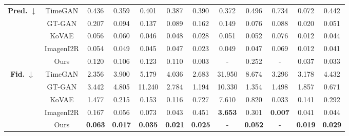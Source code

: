 \documentclass{article}
\theoremstyle{plain}
\theoremstyle{definition}
\theoremstyle{remark}
\begin{document}
\begin{table}[!t]
{\begin{tabular}{cc|cccccccccc}
    \multirow{5}{*}{\textbf{Pred.} $\downarrow$}
      & TimeGAN
         & 0.436
         & 0.359
         & 0.401
         & 0.387
         & 0.390
         & 0.372
         & 0.496
         & 0.734
         & 0.072
         & 0.442 \\
      & GT-GAN
         & 0.207
         & 0.094
         & 0.137
         & 0.089
         & 0.162
         & 0.149
         & 0.076
         & 0.088
         & 0.020
         & 0.051 \\
      & KoVAE
         & 0.056
         & 0.060
         & 0.046
         & 0.048
         & 0.028
         & 0.051
         & 0.052
         & 0.076
         & 0.012
         & 0.044 \\
      & ImagenI2R
         & 0.054
         & 0.049
         & 0.045
         & 0.047
         & 0.023
         & 0.049
         & 0.047
         & 0.069
         & 0.012
         & 0.041 \\
    & Ours
       & 0.120 & 0.106 & 0.123 & 0.110 & 0.003 & - & 0.252 & - & 0.037 & 0.033 \\
    \midrule

    \multirow{5}{*}{\textbf{Fid.} $\downarrow$}
      & TimeGAN
         & 2.356
         & 3.900
         & 5.179
         & 4.036
         & 2.683
         & 31.950
         & 8.674
         & 3.296
         & 3.178
         & 4.432 \\
      & GT-GAN
         & 3.442
         & 4.805
         & 11.240
         & 2.784
         & 1.194
         & 10.330
         & 1.354
         & 1.498
         & 1.857
         & 0.671 \\
      & KoVAE
         & 1.477
         & 0.215
         & 0.153
         & 0.116
         & 0.727
         & 7.610
         & 0.820
         & 0.033
         & 0.141
         & 0.292 \\
      & ImagenI2R
         & 0.167
         & 0.056
         & 0.073
         & 0.043
         & 0.451
         & \textbf{3.653}
         & 0.301
         & \textbf{0.007}
         & 0.041
         & 0.044 \\
    & Ours
       & \textbf{0.063} & \textbf{0.017} & \textbf{0.035} & \textbf{0.021} & \textbf{0.025} & - & \textbf{0.052} & - & \textbf{0.019} & \textbf{0.029} \\
    \midrule


\end{tabular}}
\end{table}
\end{document}

